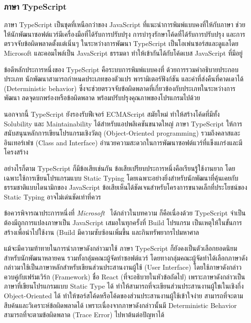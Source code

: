 \documentclass[12pt,one side,openright,a4paper]{cpe-thesis-th}
\newcommand{\thaijustify}[1]{%
  \par\hspace{30pt}\justifying
  #1
}
\begin{document}
\subsubsection{ภาษา TypeScript}
\thaijustify{
  ภาษา TypeScript เป็นชุดที่เหนือกว่าของ JavaScript ที่แนะนำการพิมพ์แบบคงที่ให้กับภาษา ช่วยให้นักพัฒนาซอฟต์แวร์มีเครื่องมือที่ได้รับการปรับปรุง การบำรุงรักษาโค้ดที่ได้รับการปรับปรุง และการตรวจจับข้อผิดพลาดตั้งแต่เนิ่นๆ ในระหว่างการพัฒนา TypeScript เป็นโอเพ่นซอร์สและดูแลโดย Microsoft และคอมไพล์เป็น JavaScript ธรรมดา ทำให้เข้ากันได้กับโค้ดเบส JavaScript ที่มีอยู่~\cite{hejlsbergts, microsoftts}
}
\thaijustify{
  ข้อดีหลักประการหนึ่งของ TypeScript คือระบบการพิมพ์แบบคงที่ ด้วยการรวมคำอธิบายประกอบประเภท นักพัฒนาสามารถกำหนดประเภทของตัวแปร พารามิเตอร์ฟังก์ชัน และค่าที่ส่งคืนที่คาดเดาได้ (Deterministic behavior) ซึ่งจะช่วยตรวจจับข้อผิดพลาดที่เกี่ยวข้องกับประเภทในระหว่างการพัฒนา ลดจุดบกพร่องหรือข้อผิดพลาด พร้อมปรับปรุงคุณภาพของโปรแกรมไปด้วย~\cite{cherny19ts, microsoftts}
}
\thaijustify{
  นอกจากนี้ TypeScript ยังรองรับฟีเจอร์ ECMAScript สมัยใหม่ ทำให้สร้างโค้ดที่มีทั้ง Solubility และ Maintainability ได้สำหรับแอปพลิเคชันขนาดใหญ่ ภาษา TypeScript ให้การสนับสนุนหลักการเขียนโปรแกรมเชิงวัตถุ (Object-Oriented programming) รวมถึงคลาสและอินเทอร์เฟซ (Class and Interface) อำนวยความสะดวกในการพัฒนาซอฟต์แวร์ที่แข็งแกร่งและมีโครงสร้าง~\cite{hejlsbergts}
}
\thaijustify{
  อย่างไรก็ตาม TypeScript ก็มีข้อเสียเช่นกัน ข้อเสียเปรียบประการหนึ่งคือเรียนรู้ใช้งานยาก โดยเฉพาะใช้การเขียนโปรแกรมแบบ Static Typing โดยเฉพาะอย่างยิ่งสำหรับนักพัฒนาที่คุ้นเคยกับธรรมชาติแบบไดนามิกของ JavaScript ข้อเสียเห็นได้ชัดเจนสำหรับโครงการขนาดเล็กที่ประโยชน์ของ Static Typing อาจไม่เด่นชัดเท่าที่ควร~\cite{cherny19ts}
}
\thaijustify{
  ข้อควรพิจารณาประการหนึ่งที่ \textit{Microsoft}~\cite{microsoftts} ได้กล่าวในบทความ ก็คือเนื่องด้วย TypeScript จำเป็นต้องมีถูกการแปลงภาษาเป็น JavaScript เสมอในทุกครั้งที่ Build โปรแกรม เป็นเหตุให้ในขั้นการสร้างเพื่อนำไปใช้งาน (Build มีความซับซ้อนเพิ่มขึ้น และกินทรัพยากรไปมหาศาล
}
\thaijustify{
  แม้จะมีความท้าทายในการนำภาษาดังกล่าวมาใช้ ภาษา TypeScript ก็ยังคงเป็นตัวเลือกยอดนิยม สำหรับนักพัฒนาหลายคน รวมทั้งกลุ่่มคณะผู้จัดทำซอฟต์แวร์ โดยทางกลุ่มคณะผู้จัดทำได้เลือกภาษาดังกล่าวมาใช้เป็นภาษาหลักสำหรับเขียนส่วนประสานงานผู้ใช้ (User Interface) โดยใช้ภาษาดังกล่าวควบคู่กับเฟร์มเวิร์ก (Framework) ชื่อ React (ที่จะอธิบายในหัวข้อถัดไป) เพราะภาษาดังกล่าวเป็นภาษาที่เขียนโปรแกรมแบบ Static Type ได้ ทำให้สามารถที่จะเขียนส่วนประสานงานผู้ใชเในเชิงกึ่ง Object-Oriented ได้ ทำให้ซอร์สโค้ดหรือโค้ดของส่วนประสานงานผู้ใช้เข้าใจง่าย สามารถที่จะตามสึบค้นและวิเคราะห์ข้อผิดพลาดได้ เพราะเนื่องจากภาษาดังกล่าวนั้นมี Deterministic Behavior สามารถที่จะตามข้อผิดพลาด (Trace Error) ไปหาต้นต่อปัญหาได้
}
\end{document}
